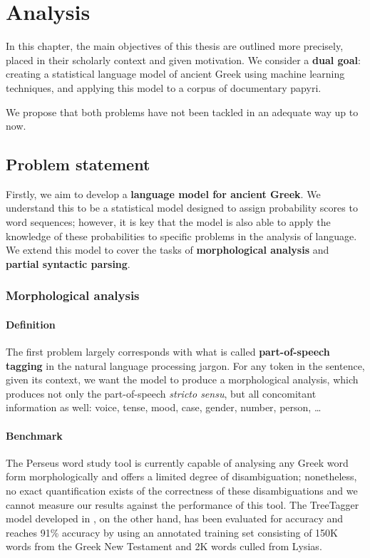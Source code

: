 
\chapter{Analysis}
\label{chp:analysis} %

In this chapter, the main objectives of this thesis are outlined more
precisely, placed in their scholarly context and given motivation. We
consider a \textbf{dual goal}: creating a statistical language model
of ancient Greek using machine learning techniques, and applying this
model to a corpus of documentary papyri.

We propose that both problems have not been tackled in an adequate way
up to now.

\section{Problem statement}
Firstly, we aim to develop a \textbf{language model for ancient
Greek}. We understand this to be a statistical model designed to
assign probability scores to word sequences; however, it is key that
the model is also able to apply the knowledge of these probabilities
to specific problems in the analysis of language. We extend this model
to cover the tasks of \textbf{morphological analysis} and
\textbf{partial syntactic parsing}.

\subsection{Morphological analysis}

\subsubsection{Definition}
The first problem largely corresponds with what is called
\textbf{part-of-speech tagging} in the natural language processing
jargon. For any token in the sentence, given its context, we want the
model to produce a morphological analysis, which produces not only the
part-of-speech \textit{stricto sensu}, but all concomitant information
as well: voice, tense, mood, case, gender, number, person, \ldots

\subsubsection{Benchmark}
The Perseus word study tool is currently capable of analysing any
Greek word form morphologically and offers a limited degree of
disambiguation; nonetheless, no exact quantification exists of the
correctness of these disambiguations and we cannot measure our results
against the performance of this tool. The TreeTagger model developed
in \cite{dik2008,dik2009}, on the other hand, has been evaluated for
accuracy and reaches 91\% accuracy by using an annotated training set
consisting of 150K words from the Greek New Testament and 2K words
culled from Lysias.

